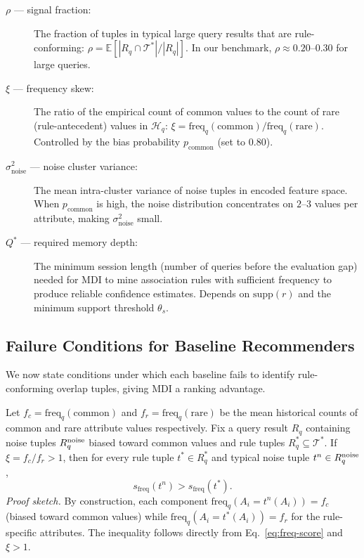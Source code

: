 \begin{description}
  \item[$\rho$ --- signal fraction:]
    The fraction of tuples in typical large query results that are
    rule-conforming:
    $\rho = \mathbb{E}[|R_q \cap \mathcal{T}^*| / |R_q|]$.
    In our benchmark, $\rho \approx 0.20$--$0.30$ for large queries.

  \item[$\xi$ --- frequency skew:]
    The ratio of the empirical count of common values to the count of rare
    (rule-antecedent) values in $\mathcal{H}_q$:
    $\xi = \text{freq}_q(\text{common}) / \text{freq}_q(\text{rare})$.
    Controlled by the bias probability $p_{\mathrm{common}}$ (set to $0.80$).

  \item[$\sigma^2_{\mathrm{noise}}$ --- noise cluster variance:]
    The mean intra-cluster variance of noise tuples in encoded feature space.
    When $p_{\mathrm{common}}$ is high, the noise distribution concentrates on
    $2$--$3$ values per attribute, making $\sigma^2_{\mathrm{noise}}$ small.

  \item[$Q^*$ --- required memory depth:]
    The minimum session length (number of queries before the evaluation gap)
    needed for MDI to mine association rules with sufficient frequency to
    produce reliable confidence estimates.  Depends on $\text{supp}(r)$ and
    the minimum support threshold $\theta_s$.
\end{description}

\subsection{Failure Conditions for Baseline Recommenders}
\label{sec:theory:failures}

We now state conditions under which each baseline fails to identify
rule-conforming overlap tuples, giving MDI a ranking advantage.

\begin{proposition}
\label{prop:freq}
Let $f_c = \text{freq}_q(\text{common})$ and $f_r = \text{freq}_q(\text{rare})$
be the mean historical counts of common and rare attribute values respectively.
Fix a query result $R_q$ containing noise tuples $R_q^{\rm noise}$ biased toward
common values and rule tuples $R_q^* \subseteq \mathcal{T}^*$.
If $\xi = f_c / f_r > 1$, then for every rule tuple $t^* \in R_q^*$ and typical
noise tuple $t^n \in R_q^{\rm noise}$,
\[
  s_{\mathrm{freq}}(t^n) > s_{\mathrm{freq}}(t^*).
\]
\textit{Proof sketch.}
By construction, each component $\text{freq}_q(A_i = t^n(A_i)) = f_c$ (biased
toward common values) while $\text{freq}_q(A_i = t^*(A_i)) = f_r$ for the
rule-specific attributes.  The inequality follows directly from Eq.~\eqref{eq:freq-score}
and $\xi > 1$.
\end{proposition}

